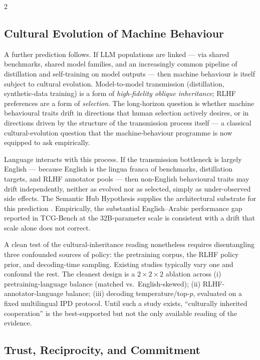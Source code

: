 \documentclass[openacc]{rsproca_new}
\begin{document}
\begin{multicols}{2}
\subsection{Cultural Evolution of Machine Behaviour}

A further prediction follows. If LLM populations are linked --- via shared benchmarks, shared model families, and an increasingly common pipeline of distillation and self-training on model outputs --- then machine behaviour is itself subject to cultural evolution. Model-to-model transmission (distillation, synthetic-data training) is a form of \emph{high-fidelity oblique inheritance}; RLHF preferences are a form of \emph{selection}. The long-horizon question is whether machine behavioural traits drift in directions that human selection actively desires, or in directions driven by the structure of the transmission process itself --- a classical cultural-evolution question that the machine-behaviour programme is now equipped to ask empirically.

Language interacts with this process. If the transmission bottleneck is largely English --- because English is the lingua franca of benchmarks, distillation targets, and RLHF annotator pools --- then non-English behavioural traits may drift independently, neither as evolved nor as selected, simply as under-observed side effects. The Semantic Hub Hypothesis supplies the architectural substrate for this prediction \cite{wu2024semantichub}. Empirically, the substantial English--Arabic performance gap reported in TCG-Bench at the 32B-parameter scale \cite{wang2025tcgbench} is consistent with a drift that scale alone does not correct.

A clean test of the cultural-inheritance reading nonetheless requires disentangling three confounded sources of policy: the pretraining corpus, the RLHF policy prior, and decoding-time sampling. Existing studies typically vary one and confound the rest. The cleanest design is a $2 \times 2 \times 2$ ablation across (i) pretraining-language balance (matched vs.\ English-skewed); (ii) RLHF-annotator-language balance; (iii) decoding temperature/top-$p$, evaluated on a fixed multilingual IPD protocol. Until such a study exists, ``culturally inherited cooperation'' is the best-supported but not the only available reading of the evidence.

\subsection{Trust, Reciprocity, and Commitment}


\end{multicols}
\end{document}
